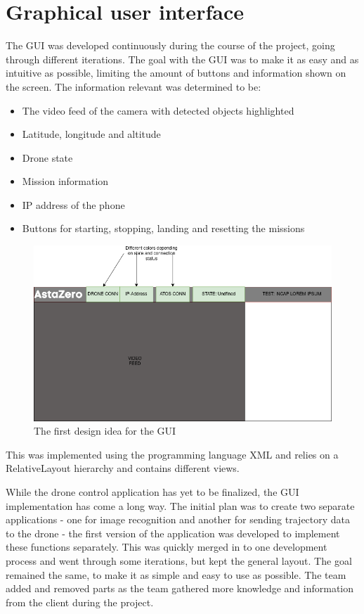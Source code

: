 \section{Graphical user interface} \label{sec:implement_GUI}
The GUI was developed continuously during the course of the project, going through different iterations. The goal with the GUI was to make it as easy and as intuitive as possible, limiting the amount of buttons and information shown on the screen. The information relevant was determined to be:
\begin{itemize}
    \item The video feed of the camera with detected objects highlighted
    \item Latitude, longitude and altitude
    \item Drone state
    \item Mission information
    \item IP address of the phone
    \item Buttons for starting, stopping, landing and resetting the missions
\end{itemize}
\begin{figure}[!h]
    \centering
    \includegraphics[width=\textwidth]{figure/v_1.2_GUI_demo_app.png}
    \caption{The first design idea for the GUI}
    \label{fig:my_label}
\end{figure}
This was implemented using the programming language XML and relies on a RelativeLayout hierarchy and contains different views. 
\newline

While the drone control application has yet to be finalized, the GUI implementation has come a long way. The initial plan was to create two separate applications - one for image recognition and another for sending trajectory data to the drone - the first version of the application was developed to implement these functions separately. This was quickly merged in to one development process and went through some iterations, but kept the general layout. The goal remained the same, to make it as simple and easy to use as possible. The team added and removed parts as the team gathered more knowledge and information from the client during the project.


